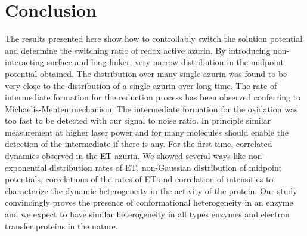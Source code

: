 
\section{Conclusion}
The results presented here show how to controllably switch the solution potential and determine the switching ratio of redox active azurin.
By introducing non-interacting surface and long linker, very narrow distribution in the midpoint potential obtained.
The distribution over many single-azurin was found to be very close to the distribution of a single-azurin over long time.
The rate of intermediate formation for the reduction process has been observed conferring to Michaelis-Menten mechanism.
The intermediate formation for the oxidation was too fast to be detected with our signal to noise ratio.
In principle similar measurement at higher laser power and for many molecules should enable the detection of the intermediate if there is any.
For the first time, correlated dynamics observed in the ET azurin.
We showed several ways like non-exponential distribution rates of ET, non-Gaussian distribution of midpoint potentials, correlations of the rates of ET and correlation of intensities to  characterize the dynamic-heterogeneity in the activity of the protein.
Our study convincingly proves the presence of conformational heterogeneity in an enzyme and we expect to have similar heterogeneity in all types enzymes and electron transfer proteins in the nature.

